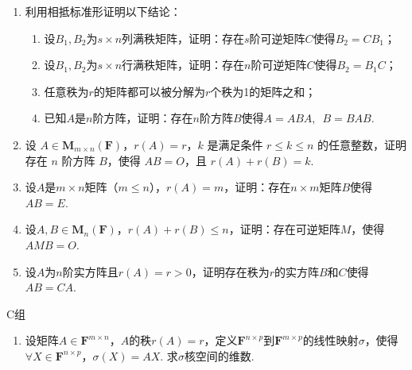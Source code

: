 \begin{enumerate}
    \item 利用相抵标准形证明以下结论：
          \begin{enumerate}
              \item 设$B_1,B_2$为$s \times n$列满秩矩阵，证明：存在$s$阶可逆矩阵$C$使得$B_2=CB_1$；

              \item 设$B_1,B_2$为$s \times n$行满秩矩阵，证明：存在$n$阶可逆矩阵$C$使得$B_2=B_1C$；

              \item 任意秩为$r$的矩阵都可以被分解为$r$个秩为1的矩阵之和；

              \item 已知$A$是$n$阶方阵，证明：存在$n$阶方阵$B$使得$A=ABA,\enspace B=BAB$.
          \end{enumerate}

    \item 设 $A \in \mathbf{M}_{m \times n}(\mathbf{F})$，$r(A)=r$，$k$ 是满足条件 $r \leqslant k \leqslant n$ 的任意整数，证明存在 $n$ 阶方阵 $B$，使得 $AB=O$，且 $r(A)+r(B)=k$.

    \item 设$A$是$m \times n$矩阵（$m \leqslant n$），$r(A)=m$，证明：存在$n \times m$矩阵$B$使得$AB=E$.

    \item 设$A,B \in \mathbf{M}_n(\mathbf{F})$，$r(A)+r(B) \leqslant n$，证明：存在可逆矩阵$M$，使得$AMB=O$.

    \item 设$A$为$n$阶实方阵且$r(A)=r>0$，证明存在秩为$r$的实方阵$B$和$C$使得$AB=CA$. %
\end{enumerate}

\centerline{\heiti C组}
\begin{enumerate}
    \item 设矩阵$A \in \mathbf{F}^{m \times n}$，$A$的秩$r(A)=r$，定义$\mathbf{F}^{n \times p}$到$\mathbf{F}^{m \times p}$的线性映射$\sigma$，使得$\forall X \in \mathbf{F}^{n \times p}$，$\sigma(X)=AX$. 求$\sigma$核空间的维数.
\end{enumerate}
